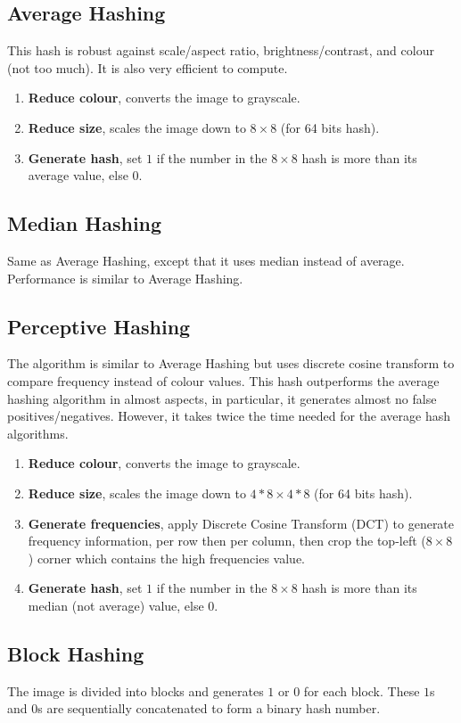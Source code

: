 \subsection{Average Hashing}
This hash is robust against scale/aspect ratio, brightness/contrast, and colour (not too much). It is also very efficient to compute.
\begin{enumerate}
    \item \textbf{Reduce colour}, converts the image to grayscale.
    \item \textbf{Reduce size}, scales the image down to $8\times8$ (for 64 bits hash).
    \item \textbf{Generate hash}, set $1$ if the number in the $8\times8$ hash is more than its average value, else $0$.
\end{enumerate}

\subsection{Median Hashing}
Same as Average Hashing, except that it uses median instead of average. Performance is similar to Average Hashing.

\subsection{Perceptive Hashing}
The algorithm is similar to Average Hashing but uses discrete cosine transform to compare frequency instead of colour values. This hash outperforms the average hashing algorithm in almost aspects, in particular, it generates almost no false positives/negatives. However, it takes twice the time needed for the average hash algorithms.
\begin{enumerate}
    \item \textbf{Reduce colour}, converts the image to grayscale.
    \item \textbf{Reduce size}, scales the image down to $4*8 \times 4*8$ (for 64 bits hash).
    \item \textbf{Generate frequencies}, apply Discrete Cosine Transform (DCT) to generate frequency information, per row then per column, then crop the top-left ($8\times8$) corner which contains the high frequencies value.
    \item \textbf{Generate hash}, set $1$ if the number in the $8\times8$ hash is more than its median (not average) value, else $0$.
\end{enumerate}

\subsection{Block Hashing}
The image is divided into blocks and generates $1$ or $0$ for each block. These $1$s and $0$s are sequentially concatenated to form a binary hash number.

